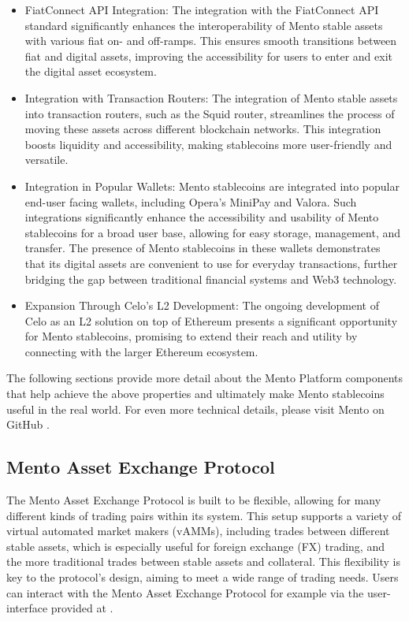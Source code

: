 \documentclass[a4paper]{article}
\theoremstyle{definition}
\begin{document}
\begin{itemize}
    \item FiatConnect API Integration: The integration with the FiatConnect API standard significantly enhances the interoperability of Mento stable assets with various fiat on- and off-ramps. This ensures smooth transitions between fiat and digital assets, improving the accessibility for users to enter and exit the digital asset ecosystem.
    
    \item Integration with Transaction Routers: The integration of Mento stable assets into transaction routers, such as the Squid router, streamlines the process of moving these assets across different blockchain networks. This integration boosts liquidity and accessibility, making stablecoins more user-friendly and versatile.
    
    \item Integration in Popular Wallets: Mento stablecoins are integrated into popular end-user facing wallets, including Opera's MiniPay and Valora. Such integrations significantly enhance the accessibility and usability of Mento stablecoins for a broad user base, allowing for easy storage, management, and transfer. The presence of Mento stablecoins in these wallets demonstrates that its digital assets are convenient to use for everyday transactions, further bridging the gap between traditional financial systems and Web3 technology.
    
    \item Expansion Through Celo's L2 Development: The ongoing development of Celo as an L2 solution on top of Ethereum presents a significant opportunity for Mento stablecoins, promising to extend their reach and utility by connecting with the larger Ethereum ecosystem.
\end{itemize}

The following sections provide more detail about the Mento Platform components that help achieve the above properties and ultimately make Mento stablecoins useful in the real world. For even more technical details, please visit Mento on GitHub \cite{mento_github}.

\subsection{Mento Asset Exchange Protocol}
The Mento Asset Exchange Protocol is built to be flexible, allowing for many different kinds of trading pairs within its system. This setup supports a variety of virtual automated market makers (vAMMs), including trades between different stable assets, which is especially useful for foreign exchange (FX) trading, and the more traditional trades between stable assets and collateral. This flexibility is key to the protocol's design, aiming to meet a wide range of trading needs. Users can interact with the Mento Asset Exchange Protocol for example via the user-interface provided at \cite{mento_app}.
\end{document}
